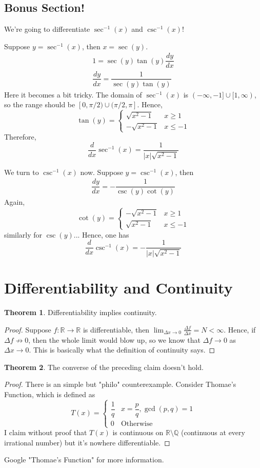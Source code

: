 \documentclass{article}
\theoremstyle{definition}
\theoremstyle{definition}
\theoremstyle{definition}
\theoremstyle{definition}
\theoremstyle{definition}
\theoremstyle{definition}
\theoremstyle{definition}
\theoremstyle{definition}
\theoremstyle{definition}
\newtheorem{theorem}{Theorem}[section]
\begin{document}
\subsection{Bonus Section!}
We're going to differentiate $\sec^{-1}(x)$ and $\csc^{-1}(x)$!

Suppose $y=\sec^{-1}(x)$, then $x=\sec(y)$.
\begin{align*}
    1=\sec(y)\tan(y)\dfrac{dy}{dx}\\
    \dfrac{dy}{dx}=\dfrac{1}{\sec(y)\tan(y)}
\end{align*}
Here it becomes a bit tricky. The domain of $\sec^{-1}(x)$ is $(-\infty,-1]\cup[1,\infty)$, so the range should be $[0,\pi/2)\cup(\pi/2,\pi]$. Hence, 
\[
\tan(y)=
\begin{cases}
\sqrt{x^2-1} & x\ge 1\\
-\sqrt{x^2-1} & x\le -1
\end{cases}
\]
Therefore,
\[\dfrac{d}{dx}\sec^{-1}(x)=\dfrac{1}{|x|\sqrt{x^2-1}}\]

We turn to $\csc^{-1}(x)$ now.
Suppose $y=\csc^{-1}(x)$, then
\begin{align*}
    \dfrac{dy}{dx}=-\dfrac{1}{\csc(y)\cot(y)}
\end{align*}
Again, 
\[
\cot(y)=\begin{cases}
-\sqrt{x^2-1} & x\ge 1\\
\sqrt{x^2-1} & x\le -1
\end{cases}
\]
similarly for $\csc(y)$...
Hence, one has
\[\dfrac{d}{dx}\csc^{-1}(x)=-\dfrac{1}{|x|\sqrt{x^2-1}}\]

\section{Differentiability and Continuity}
\begin{theorem}
Differentiability implies continuity.
\end{theorem}
\begin{proof}
Suppose $f:\mathbb{R}\to\mathbb{R}$ is differentiable, then $\lim_{\Delta x\to0}\frac{\Delta f}{\Delta x}=N<\infty$. Hence, if $\Delta f\not\to 0$, then the whole limit would blow up, so we know that $\Delta f\to 0$ as $\Delta x\to 0$. This is basically what the definition of continuity says.
\end{proof}
\begin{theorem}
The converse of the preceding claim doesn't hold.
\end{theorem}
\begin{proof}
There is an simple but "philo" counterexample. Consider Thomae's Function, which is defined as
\[
T(x)=\begin{cases}
\dfrac{1}{q} & x=\dfrac{p}{q}, \operatorname{gcd}(p,q)=1\\
0 & \text{Otherwise}
\end{cases}
\]
I claim without proof that $T(x)$ is continuous on $\mathbb{R}\setminus\mathbb{Q}$ (continuous at every irrational number) but it's nowhere differentiable.
\end{proof}
Google "Thomae's Function" for more information.
\end{document}
